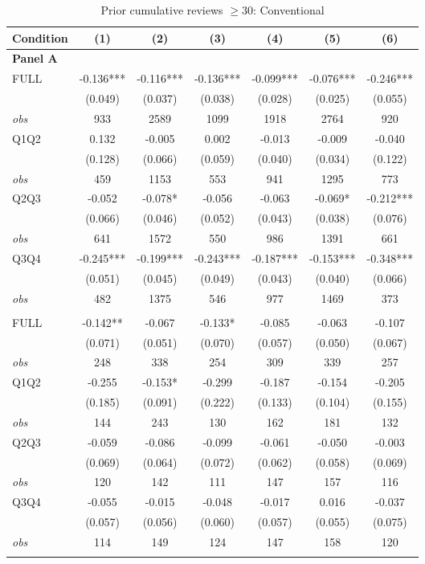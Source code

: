 \begin{table}[!htbp]
\centering
\caption{Prior cumulative reviews $\geq30$: Conventional}
\begin{tabular}{lcccccc}
\toprule
Condition & (1) & (2) & (3) & (4) & (5) & (6) \\
\midrule
\multicolumn{7}{l}{\textbf{Panel A}} \\

FULL & -0.136*** & -0.116*** & -0.136*** & -0.099*** & -0.076*** & -0.246*** \\
 & (0.049) & (0.037) & (0.038) & (0.028) & (0.025) & (0.055) \\
\textit{obs} & 933 & 2589 & 1099 & 1918 & 2764 & 920 \\
Q1Q2 & 0.132 & -0.005 & 0.002 & -0.013 & -0.009 & -0.040 \\
 & (0.128) & (0.066) & (0.059) & (0.040) & (0.034) & (0.122) \\
\textit{obs} & 459 & 1153 & 553 & 941 & 1295 & 773 \\
Q2Q3 & -0.052 & -0.078* & -0.056 & -0.063 & -0.069* & -0.212*** \\
 & (0.066) & (0.046) & (0.052) & (0.043) & (0.038) & (0.076) \\
\textit{obs} & 641 & 1572 & 550 & 986 & 1391 & 661 \\
Q3Q4 & -0.245*** & -0.199*** & -0.243*** & -0.187*** & -0.153*** & -0.348*** \\
 & (0.051) & (0.045) & (0.049) & (0.043) & (0.040) & (0.066) \\
\textit{obs} & 482 & 1375 & 546 & 977 & 1469 & 373 \\
\addlinespace
\multicolumn{7}{l}{\textbf{Panel B}} \\

FULL & -0.142** & -0.067 & -0.133* & -0.085 & -0.063 & -0.107 \\
 & (0.071) & (0.051) & (0.070) & (0.057) & (0.050) & (0.067) \\
\textit{obs} & 248 & 338 & 254 & 309 & 339 & 257 \\
Q1Q2 & -0.255 & -0.153* & -0.299 & -0.187 & -0.154 & -0.205 \\
 & (0.185) & (0.091) & (0.222) & (0.133) & (0.104) & (0.155) \\
\textit{obs} & 144 & 243 & 130 & 162 & 181 & 132 \\
Q2Q3 & -0.059 & -0.086 & -0.099 & -0.061 & -0.050 & -0.003 \\
 & (0.069) & (0.064) & (0.072) & (0.062) & (0.058) & (0.069) \\
\textit{obs} & 120 & 142 & 111 & 147 & 157 & 116 \\
Q3Q4 & -0.055 & -0.015 & -0.048 & -0.017 & 0.016 & -0.037 \\
 & (0.057) & (0.056) & (0.060) & (0.057) & (0.055) & (0.075) \\
\textit{obs} & 114 & 149 & 124 & 147 & 158 & 120 \\
\addlinespace
\multicolumn{7}{l}{\textbf{Panel C}} \\


\end{tabular}
\end{table}
